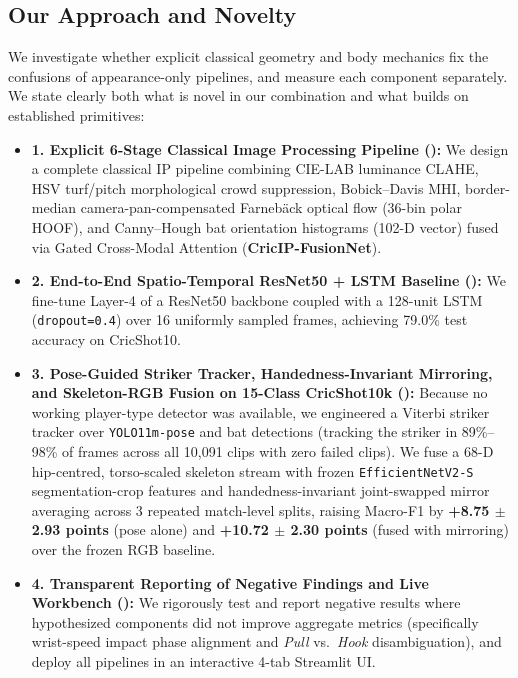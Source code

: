 \subsection{Our Approach and Novelty}
We investigate whether explicit classical geometry and body mechanics fix the confusions of appearance-only pipelines, and measure each component separately. We state clearly both what is novel in our combination and what builds on established primitives:
\begin{itemize}
    \item \textbf{1. Explicit 6-Stage Classical Image Processing Pipeline ():} We design a complete classical IP pipeline combining CIE-LAB luminance CLAHE, HSV turf/pitch morphological crowd suppression, Bobick--Davis MHI, border-median camera-pan-compensated Farneb\"{a}ck optical flow (36-bin polar HOOF), and Canny--Hough bat orientation histograms (102-D vector) fused via Gated Cross-Modal Attention (\textbf{CricIP-FusionNet}).
    \item \textbf{2. End-to-End Spatio-Temporal ResNet50 + LSTM Baseline ():} We fine-tune Layer-4 of a ResNet50 backbone coupled with a 128-unit LSTM (\texttt{dropout=0.4}) over 16 uniformly sampled frames, achieving 79.0\% test accuracy on CricShot10.
    \item \textbf{3. Pose-Guided Striker Tracker, Handedness-Invariant Mirroring, and Skeleton-RGB Fusion on 15-Class CricShot10k ():} Because no working player-type detector was available, we engineered a Viterbi striker tracker over \texttt{YOLO11m-pose} and bat detections (tracking the striker in 89\%--98\% of frames across all 10,091 clips with zero failed clips). We fuse a 68-D hip-centred, torso-scaled skeleton stream with frozen \texttt{EfficientNetV2-S} segmentation-crop features and handedness-invariant joint-swapped mirror averaging across 3 repeated match-level splits, raising Macro-F1 by \textbf{+8.75 $\pm$ 2.93 points} (pose alone) and \textbf{+10.72 $\pm$ 2.30 points} (fused with mirroring) over the frozen RGB baseline.
    \item \textbf{4. Transparent Reporting of Negative Findings and Live Workbench ():} We rigorously test and report negative results where hypothesized components did not improve aggregate metrics (specifically wrist-speed impact phase alignment and \textit{Pull} vs.\ \textit{Hook} disambiguation), and deploy all pipelines in an interactive 4-tab Streamlit UI.
\end{itemize}

